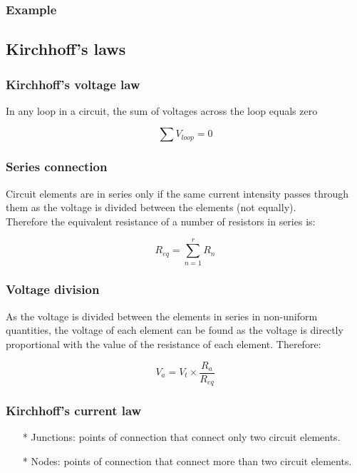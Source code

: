\documentclass[a4paper]{book}
\begin{document}
\subsubsection{Example}


\subsection{Kirchhoff's laws}

\subsubsection{Kirchhoff's voltage law}

In any loop in a circuit, the sum of voltages across the loop equals zero

\[\sum V_{loop} = 0\]

\subsubsection{Series connection}

Circuit elements are in series only if the same current intensity passes through them as the voltage is divided between the elements (not equally).\\
Therefore the equivalent resistance of a number of resistors in series is:

\[R_{eq} = \sum_{n = 1}^r R_{n}\]

\subsubsection{Voltage division}

As the voltage is divided between the elements in series in non-uniform quantities, the voltage of each element can be found as the voltage 
is directly proportional with the value of the resistance of each element. Therefore:

\[V_a = V_t \times \frac{R_a}{R_{eq}}\]

\subsubsection{Kirchhoff's current law}

\begin{itemize}


  \item[*] Junctions: points of connection that connect only two circuit elements.

  \item[*] Nodes: points of connection that connect more than two circuit elements.

\end{itemize}
\end{document}
